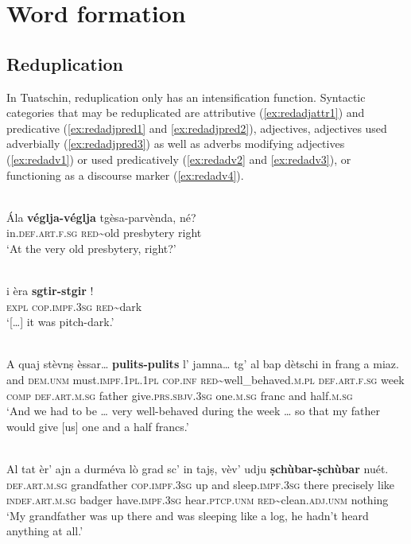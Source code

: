 \chapter{Word formation}

\section{Reduplication}
In Tuatschin, reduplication only has an intensification function. Syntactic categories that may be reduplicated are attributive (\ref{ex:redadjattr1}) and predicative (\ref{ex:redadjpred1} and \ref{ex:redadjpred2}),  adjectives, adjectives used adverbially (\ref{ex:redadjpred3}) as well as adverbs modifying adjectives (\ref{ex:redadv1}) or used predicatively (\ref{ex:redadv2} and \ref{ex:redadv3}), or functioning as a discourse marker (\ref{ex:redadv4}).

\ea\label{ex:redadjattr1}
\\
\gll  Ála \textbf{véglja-véglja} tgèsa-parvènda, né?  \\
in.\textsc{def.art.f.sg} \textsc{red}\textasciitilde{old} presbytery right\\
\glt `At the very old presbytery, right?'
\z

\ea\label{ex:redadjpred1}
\\
\gll  […] i èra \textbf{sgtir-stgir} !\\
[…]  \textsc{expl} \textsc{cop.impf.3sg} \textsc{red}\textasciitilde{dark}\\
\glt `[…] it was pitch-dark.'
\z

\ea\label{ex:redadjpred2}
\\
\gll    A quaj stèvnṣ èssar… \textbf{pulits-pulits} l’ jamna… tg’ al bap dètschi in frang a miaz.\\
and \textsc{dem.unm} must.\textsc{impf.1pl.1pl} \textsc{cop.inf} \textsc{red}\textasciitilde{well\_behaved}.\textsc{m.pl} \textsc{def.art.f.sg} week  \textsc{comp} \textsc{def.art.m.sg} father  give.\textsc{prs.sbjv.3sg} one.\textsc{m.sg} franc and half.\textsc{m.sg}\\
\glt `And we had to be … very well-behaved during the week … so that my father would give [us] one and a half francs.'
\z

\ea\label{ex:redadjpred3}
\\
\gll  Al tat èr’ ajn a durméva lò grad sc’ in tajṣ, vèv’ udju \textbf{ṣchùbar-ṣchùbar} nuét.  \\
\textsc{def.art.m.sg} grandfather \textsc{cop.impf.3sg} up and sleep.\textsc{impf.3sg} there precisely like \textsc{indef.art.m.sg} badger have.\textsc{impf.3sg} hear.\textsc{ptcp.unm} \textsc{red}\textasciitilde{clean}.\textsc{adj.unm} nothing\\
\glt `My grandfather was up there and was sleeping like a log, he hadn’t heard anything at all.'
\z

